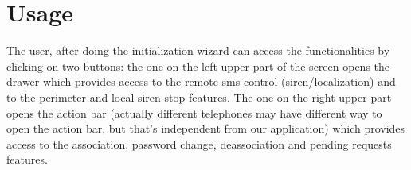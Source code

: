\section{Usage}
\small{The user, after doing the initialization wizard can access the functionalities by clicking on two buttons: the one on the left upper part of the screen opens the drawer which provides access to the remote sms control (siren/localization) and to the perimeter and local siren stop features. The one on the right upper part opens the action bar (actually different telephones may have different way to open the action bar, but that's independent from our application) which provides access to the association, password change, deassociation and pending requests features.}